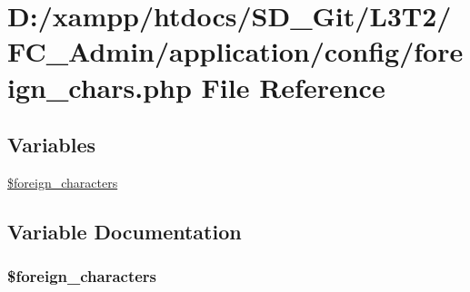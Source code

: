 \hypertarget{_admin_2application_2config_2foreign__chars_8php}{}\section{D\+:/xampp/htdocs/\+S\+D\+\_\+\+Git/\+L3\+T2/\+F\+C\+\_\+\+Admin/application/config/foreign\+\_\+chars.php File Reference}
\label{_admin_2application_2config_2foreign__chars_8php}
\subsection*{Variables}
\begin{DoxyCompactItemize}
\item 
\hyperlink{_admin_2application_2config_2foreign__chars_8php_a77bf091eac4b63b8efea27293e5ca79b}{\$foreign\+\_\+characters}
\end{DoxyCompactItemize}


\subsection{Variable Documentation}
\hypertarget{_admin_2application_2config_2foreign__chars_8php_a77bf091eac4b63b8efea27293e5ca79b}{}
\subsubsection[{\$foreign\+\_\+characters}]{\setlength{\rightskip}{0pt plus 5cm}\$foreign\+\_\+characters}\label{_admin_2application_2config_2foreign__chars_8php_a77bf091eac4b63b8efea27293e5ca79b}
